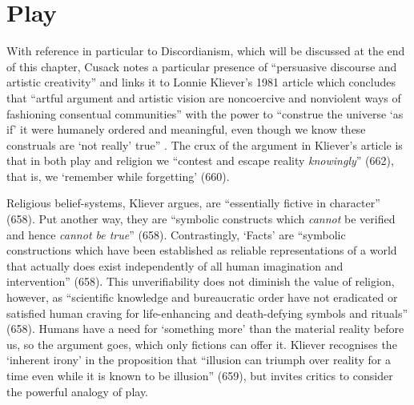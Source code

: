 \documentclass[Draft.tex]{subfiles}
\begin{document}
\section*{Play}
With reference in particular to Discordianism,
which will be discussed at the end of this chapter,
Cusack \parencite*[23]{Cusack10} notes a particular presence of
``persuasive discourse and artistic creativity'' and links it to
Lonnie Kliever's 1981 article which concludes that
``artful argument and artistic vision are noncoercive and nonviolent ways
of fashioning consentual communities'' with the power to
``construe the universe `as if' it were humanely ordered and meaningful,
even though we know these construals are
`not really' true'' \parencite[665]{Kliever81}.
The crux of the argument in Kliever's article is that
in both play and religion we
``contest and escape reality \textit{knowingly}'' (662),
that is, we `remember while forgetting' (660).

Religious belief-systems, Kliever argues,
are ``essentially fictive in character'' (658).
Put another way, they are
``symbolic constructs which \textit{cannot} be verified
and hence \textit{cannot be true}'' (658).
Contrastingly, `Facts' are
``symbolic constructions which have been established as
reliable representations of a world that actually does exist
independently of all human imagination and intervention'' (658).
This unverifiability does not diminish the value of religion,
however, as ``scientific knowledge and bureaucratic order
have not eradicated or satisfied human craving
for life-enhancing and death-defying symbols and rituals'' (658).
Humans have a need for `something more' than
the material reality before us, so the argument goes,
which only fictions can offer it.
Kliever recognises the `inherent irony' in the proposition that
``illusion can triumph over reality for a time
even while it is known to be illusion'' (659),
but invites critics to consider the powerful analogy of play.
\end{document}
